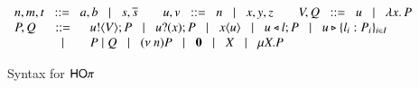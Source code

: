\begin{figure}[t!]
\[
	\begin{array}{rcl}
		\multicolumn{3}{c}{
			n, m, t \bnfis a, b \bnfbar s, \dual{s} \qquad u,v \bnfis n \bnfbar x, y, z \qquad V, Q \bnfis u \bnfbar \abs{x}{P}
		}
		\\
		P, Q	&\bnfis&	\bout{u}{V} P \bnfbar \binp{u}{x} P \bnfbar \appl{x}{u} \bnfbar \bsel{u}{l} P \bnfbar \bbra{u}{l_i: P_i}_{i \in I}\\
			&\bnfbar&	P \Par Q \bnfbar \news{n} P \bnfbar \inact \bnfbar \varp{X} \bnfbar  \recp{X}{P}
	\end{array}
\]
	\caption{Syntax for $\mathsf{HO}\pi$ \label{fig:syntax}}
\end{figure}

